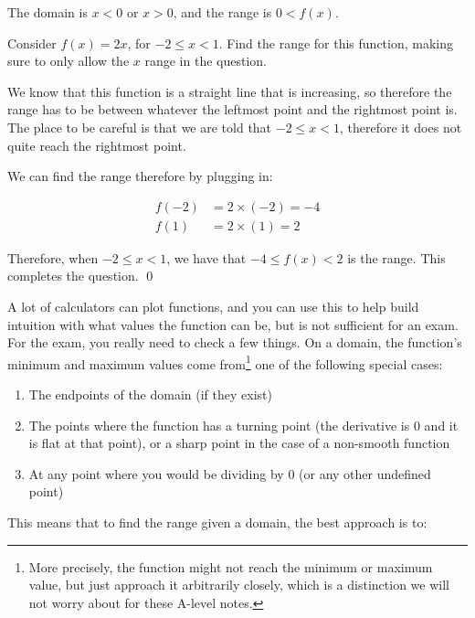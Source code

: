The domain is $x<0$ or $x>0$, and the range is $0 < f(x)$.

\begin{example}
    Consider $f(x) = 2x$, for $-2\leq x < 1$. Find the range for this function, making sure to only allow the $x$ range in the question.
\end{example}
\begin{solution}
    We know that this function is a straight line that is increasing, so therefore the range has to be between whatever the leftmost point and the rightmost point is. The place to be careful is that 
    we are told that $-2\leq x < 1$, therefore it does not quite reach the rightmost point.
     
    We can find the range therefore by plugging in:

    \begin{align*}
        f(-2) &= 2\times(-2) = -4\\
        f(1) &= 2\times(1) = 2
    \end{align*}

    Therefore, when $-2\leq x < 1$, we have that $-4 \leq f(x) < 2$ is the range. This completes the question.
    \qed
\end{solution}

A lot of calculators can plot functions, and you can use this to help build intuition with what values the function can be, but is not sufficient for an exam. For the exam, you really need to check a few things. 
On a domain, the function's minimum and maximum values come from\footnote{More precisely, the function might not reach the minimum or maximum value, but just approach it arbitrarily closely, which is a distinction we will not worry about for these A-level notes.} one of the following special cases:

\begin{enumerate}
    \item The endpoints of the domain (if they exist)
    \item The points where the function has a turning point (the derivative is $0$ and it is flat at that point), or a sharp point in the case of a non-smooth function
    \item At any point where you would be dividing by $0$ (or any other undefined point)
\end{enumerate}

This means that to find the range given a domain, the best approach is to:

